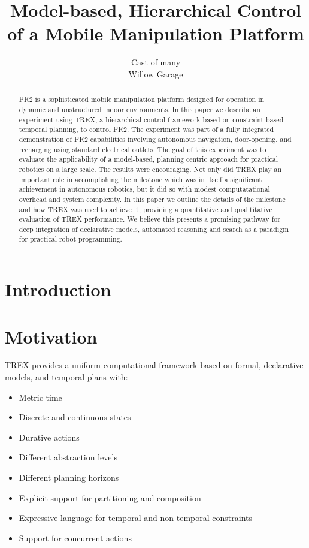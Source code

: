\documentclass[letterpaper]{article}
\begin{document}
%
\title{Model-based, Hierarchical Control of a Mobile Manipulation Platform}
\author{Cast of many\\
Willow Garage
}
\maketitle
\begin{abstract}
PR2 is a sophisticated mobile manipulation platform designed for operation in dynamic and unstructured indoor environments. In this paper we describe an experiment using TREX, a hierarchical control framework based on constraint-based temporal planning, to control PR2. The experiment was part of a fully integrated demonstration of PR2 capabilities involving autonomous navigation, door-opening, and recharging using standard electrical outlets. The goal of this experiment was to evaluate the applicability of a model-based, planning centric approach for practical robotics on a large scale. The results were encouraging. Not only did TREX play an important role in accomplishing the milestone which was in itself  a significant achievement in autonomous robotics, but it did so with modest computatational overhead and system complexity. In this paper we outline the details of the milestone and how TREX was used to achieve it, providing a quantitative and qualititative evaluation of TREX performance. We believe this presents a promising pathway for deep integration of declarative models, automated reasoning and search as a paradigm for practical robot programming.
\begin{quote}
\end{quote}
\end{abstract}

\section{Introduction}

\section{Motivation}
TREX provides a uniform computational framework based on formal, declarative models, and temporal plans with:
\begin{itemize}
\item Metric time
\item Discrete and continuous states
\item Durative actions
\item Different abstraction levels
\item Different planning horizons
\item Explicit support for partitioning and composition
\item Expressive language for temporal and non-temporal constraints
\item Support for concurrent actions
\end{itemize}
\end{document}
